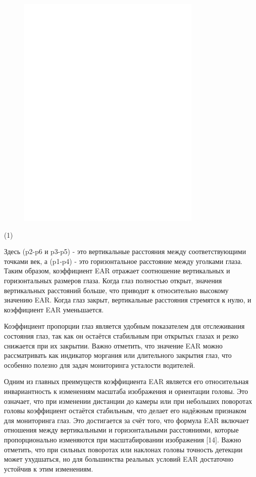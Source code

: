 \begin{figure}[H]
	\centering
	\includegraphics[width=0.8\textwidth]{media/ict/image13}
	\caption*{}
\end{figure}

(1)

Здесь (p2-p6 и p3-p5) - это вертикальные расстояния между
соответствующими точками век, а (p1-p4) - это горизонтальное расстояние
между уголками глаза. Таким образом, коэффициент EAR отражает
соотношение вертикальных и горизонтальных размеров глаза. Когда глаз
полностью открыт, значения вертикальных расстояний больше, что приводит
к относительно высокому значению EAR. Когда глаз закрыт, вертикальные
расстояния стремятся к нулю, и коэффициент EAR уменьшается.

Коэффициент пропорции глаз является удобным показателем для отслеживания
состояния глаз, так как он остаётся стабильным при открытых глазах и
резко снижается при их закрытии. Важно отметить, что значение EAR можно
рассматривать как индикатор моргания или длительного закрытия глаз, что
особенно полезно для задач мониторинга усталости водителей.

Одним из главных преимуществ коэффициента EAR является его относительная
инвариантность к изменениям масштаба изображения и ориентации головы.
Это означает, что при изменении дистанции до камеры или при небольших
поворотах головы коэффициент остаётся стабильным, что делает его
надёжным признаком для мониторинга глаз. Это достигается за счёт того,
что формула EAR включает отношения между вертикальными и горизонтальными
расстояниями, которые пропорционально изменяются при масштабировании
изображения {[}14{]}. Важно отметить, что при сильных поворотах или
наклонах головы точность детекции может ухудшаться, но для большинства
реальных условий EAR достаточно устойчив к этим изменениям.

